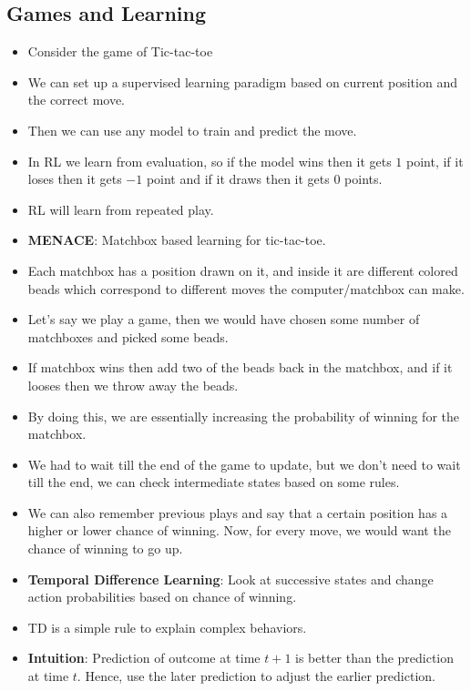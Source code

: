 \documentclass[a4paper]{article}
\begin{document}
\subsection{Games and Learning}
\begin{itemize}
    \item Consider the game of Tic-tac-toe
    \item We can set up a supervised learning paradigm based on current position and the correct move.
    \item Then we can use any model to train and predict the move.
    \item In RL we learn from evaluation, so if the model wins then it gets $1$ point, if it loses then it gets $-1$ point and if it draws then it gets $0$ points.
    \item RL will learn from repeated play.
    \item \textbf{MENACE}: Matchbox based learning for tic-tac-toe.
    \item Each matchbox has a position drawn on it, and inside it are different colored beads which correspond to different moves the computer/matchbox can make.
    \item Let's say we play a game, then we would have chosen some number of matchboxes and picked some beads.
    \item If matchbox wins then add two of the beads back in the matchbox, and if it looses then we throw away the beads.
    \item By doing this, we are essentially increasing the probability of winning for the matchbox.
    \item We had to wait till the end of the game to update, but we don't need to wait till the end, we can check intermediate states based on some rules.
    \item We can also remember previous plays and say that a certain position has a higher or lower chance of winning. Now, for every move, we would want the chance of winning to go up.
    \item \textbf{Temporal Difference Learning}: Look at successive states and change action probabilities based on chance of winning.
    \item TD is a simple rule to explain complex behaviors.
    \item \textbf{Intuition}: Prediction of outcome at time $t+1$ is better than the prediction at time $t$. Hence, use the later prediction to adjust the earlier prediction.
\end{itemize}
\end{document}
